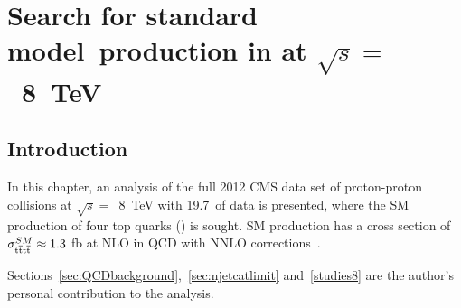 \chapter{Search for standard model~\tttt production in \runone at $\sqrt{s} =$~8~TeV }
\label{c:Run1}

\section{Introduction}
In this chapter, an analysis of the full 2012 CMS data set of proton-proton collisions at $\sqrt{s} =$~8~TeV with 19.7~\fbinv of data is presented, where the SM production of four top quarks (\tttt) is sought. SM \tttt production has a cross section of $\sigma_{{\mathrm{t}\overline{\mathrm{t}}\mathrm{t}\overline{\mathrm{t}}}}^{SM}  \approx 1.3$ fb at NLO in QCD with NNLO corrections~\cite{Barger201070,Bevilacqua2012}. 



Sections~\ref{sec:QCDbackground},~\ref{sec:njetcatlimit} and~\ref{studies8} are the author's personal contribution to the analysis.


